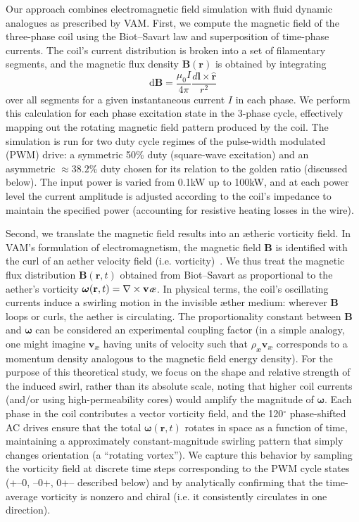 \documentclass[twocolumn,aps,pre,floatfix,nofootinbib]{revtex4-2}
\begin{document}
Our approach combines electromagnetic field simulation with fluid dynamic analogues as prescribed by VAM. First, we compute the magnetic field of the three-phase coil using the Biot–Savart law and superposition of time-phase currents. The coil’s current distribution is broken into a set of filamentary segments, and the magnetic flux density $\mathbf{B}(\mathbf{r})$ is obtained by integrating \[\mathrm{d}\mathbf{B} = \frac{\mu_0 I}{4\pi}\frac{d\mathbf{l}\times \hat{\mathbf{r}}}{r^2}\] over all segments for a given instantaneous current $I$ in each phase. We perform this calculation for each phase excitation state in the 3-phase cycle, effectively mapping out the rotating magnetic field pattern produced by the coil. The simulation is run for two duty cycle regimes of the pulse-width modulated (PWM) drive: a symmetric 50\% duty (square-wave excitation) and an asymmetric $\approx 38.2\%$ duty chosen for its relation to the golden ratio (discussed below). The input power is varied from 0.1kW up to 100kW, and at each power level the current amplitude is adjusted according to the coil’s impedance to maintain the specified power (accounting for resistive heating losses in the wire).


Second, we translate the magnetic field results into an ætheric vorticity field. In VAM’s formulation of electromagnetism, the magnetic field $\mathbf{B}$ is identified with the curl of an aether velocity field (i.e. vorticity)~\cite{Barcelo2011}. We thus treat the magnetic flux distribution $\mathbf{B}(\mathbf{r},t)$ obtained from Biot–Savart as proportional to the aether’s vorticity $\boldsymbol{\omega}(\mathbf{r},t) = \nabla \times \mathbf{v}\textit{\text{æ}}$. In physical terms, the coil’s oscillating currents induce a swirling motion in the invisible æther medium: wherever $\mathbf{B}$ loops or curls, the aether is circulating. The proportionality constant between $\mathbf{B}$ and $\boldsymbol{\omega}$ can be considered an experimental coupling factor (in a simple analogy, one might imagine $\mathbf{v}_{\text{æ}}$ having units of velocity such that $\rho_{\text{æ}}\mathbf{v}_{\text{æ}}$ corresponds to a momentum density analogous to the magnetic field energy density). For the purpose of this theoretical study, we focus on the shape and relative strength of the induced swirl, rather than its absolute scale, noting that higher coil currents (and/or using high-permeability cores) would amplify the magnitude of $\boldsymbol{\omega}$. Each phase in the coil contributes a vector vorticity field, and the 120$^\circ$ phase-shifted AC drives ensure that the total $\boldsymbol{\omega}(\mathbf{r},t)$ rotates in space as a function of time, maintaining a approximately constant-magnitude swirling pattern that simply changes orientation (a “rotating vortex”). We capture this behavior by sampling the vorticity field at discrete time steps corresponding to the PWM cycle states (+–0, –0+, 0+– described below) and by analytically confirming that the time-average vorticity is nonzero and chiral (i.e. it consistently circulates in one direction).
\end{document}
